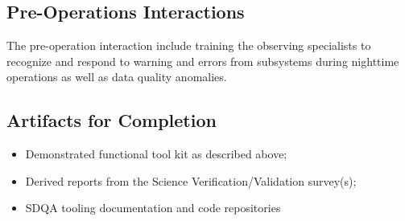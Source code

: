 




\subsection{Pre-Operations Interactions}
The pre-operation interaction include training the observing specialists to recognize and respond to warning and errors from subsystems during nighttime operations as well as data quality anomalies.

\subsection{Artifacts for Completion}

\begin{itemize}

	\item Demonstrated functional tool kit as described above;
	\item Derived reports from the Science Verification/Validation survey(s);
	\item SDQA tooling documentation and code repositories

\end{itemize}






